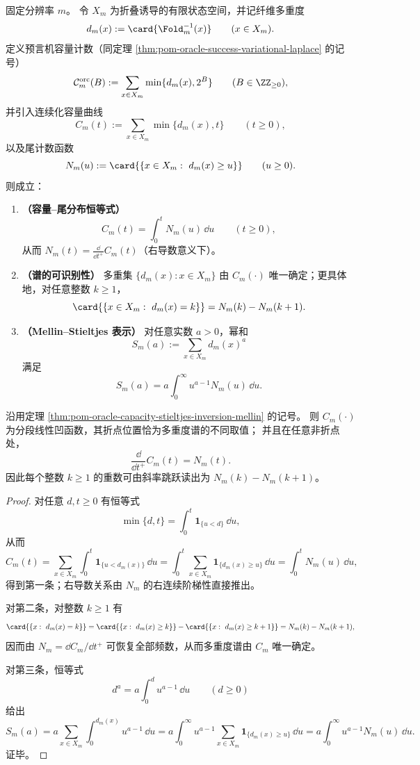 \begin{theorem}\label{thm:pom-oracle-capacity-stieltjes-inversion-mellin}
固定分辨率 \(m\)。
令 \(X_m\) 为折叠诱导的有限状态空间，并记纤维多重度
\[
d_m(x):=\card{\Fold_m^{-1}(x)}\qquad(x\in X_m).
\]
定义预言机容量计数（同定理 \ref{thm:pom-oracle-success-variational-laplace} 的记号）
\[
\mathcal{C}^{\mathrm{orc}}_m(B):=\sum_{x\in X_m}\min\{d_m(x),2^B\}\qquad(B\in\ZZ_{\ge 0}),
\]
并引入连续化容量曲线
\[
C_m(t):=\sum_{x\in X_m}\min\{d_m(x),t\}\qquad(t\ge 0),
\]
以及尾计数函数
\[
N_m(u):=\card{\{x\in X_m:\ d_m(x)\ge u\}}\qquad(u\ge 0).
\]
则成立：
\begin{enumerate}
  \item \textbf{（容量--尾分布恒等式）}
  \[
  C_m(t)=\int_{0}^{t}N_m(u)\,\dd u\qquad(t\ge 0),
  \]
  从而 \(N_m(t)=\frac{\dd}{\dd t^+}C_m(t)\)（右导数意义下）。
  \item \textbf{（谱的可识别性）}
  多重集 \(\{d_m(x):x\in X_m\}\) 由 \(C_m(\cdot)\) 唯一确定；更具体地，对任意整数 \(k\ge 1\)，
  \[
  \card{\{x\in X_m:\ d_m(x)=k\}}=N_m(k)-N_m(k+1).
  \]
  \item \textbf{（Mellin--Stieltjes 表示）}
  对任意实数 \(a>0\)，幂和
  \[
  S_m(a):=\sum_{x\in X_m}d_m(x)^a
  \]
  满足
  \[
  S_m(a)=a\int_{0}^{\infty}u^{a-1}N_m(u)\,\dd u.
  \]
\end{enumerate}
\end{theorem}

\begin{corollary}[容量曲线的折点与斜率跳跃]\label{cor:pom-oracle-capacity-kinks-slopes}
沿用定理 \ref{thm:pom-oracle-capacity-stieltjes-inversion-mellin} 的记号。
则 \(C_m(\cdot)\) 为分段线性凹函数，其折点位置恰为多重度谱的不同取值；
并且在任意非折点处，
\[
\frac{\dd}{\dd t^+}C_m(t)=N_m(t).
\]
因此每个整数 \(k\ge 1\) 的重数可由斜率跳跃读出为 \(N_m(k)-N_m(k+1)\)。
\end{corollary}

\begin{proof}
对任意 \(d,t\ge 0\) 有恒等式
\[
\min\{d,t\}=\int_{0}^{t}\mathbf 1_{\{u<d\}}\,\dd u,
\]
从而
\[
C_m(t)
=\sum_{x\in X_m}\int_{0}^{t}\mathbf 1_{\{u<d_m(x)\}}\,\dd u
=\int_{0}^{t}\sum_{x\in X_m}\mathbf 1_{\{d_m(x)\ge u\}}\,\dd u
=\int_{0}^{t}N_m(u)\,\dd u,
\]
得到第一条；右导数关系由 \(N_m\) 的右连续阶梯性直接推出。
\par
对第二条，对整数 \(k\ge 1\) 有
\[
\card{\{x:\ d_m(x)=k\}}
=\card{\{x:\ d_m(x)\ge k\}}-\card{\{x:\ d_m(x)\ge k+1\}}
=N_m(k)-N_m(k+1),
\]
因而由 \(N_m=\dd C_m/\dd t^+\) 可恢复全部频数，从而多重度谱由 \(C_m\) 唯一确定。
\par
对第三条，恒等式
\[
d^a=a\int_{0}^{d}u^{a-1}\,\dd u\qquad(d\ge 0)
\]
给出
\[
S_m(a)
=a\sum_{x\in X_m}\int_{0}^{d_m(x)}u^{a-1}\,\dd u
=a\int_{0}^{\infty}u^{a-1}\sum_{x\in X_m}\mathbf 1_{\{d_m(x)\ge u\}}\,\dd u
=a\int_{0}^{\infty}u^{a-1}N_m(u)\,\dd u.
\]
证毕。
\end{proof}

\endinput
